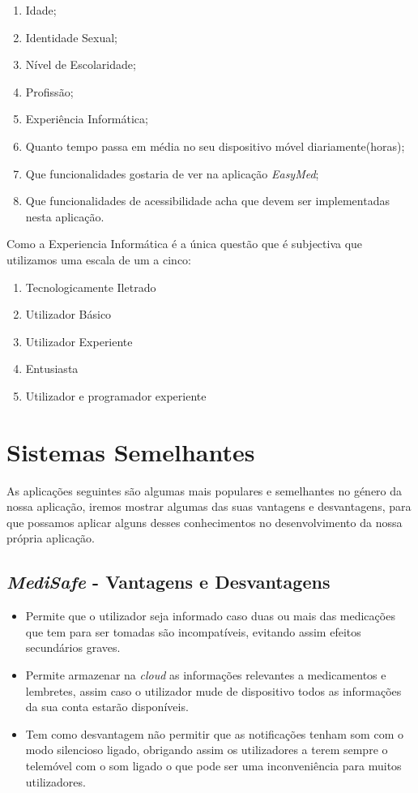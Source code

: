 \documentclass[a4paper]{article}
\begin{document}
\begin{enumerate}
    \item Idade;
    \item Identidade Sexual;
    \item Nível de Escolaridade;
    \item Profissão;
    \item Experiência Informática;
    \item Quanto tempo passa em média no seu dispositivo móvel diariamente(horas);
    \item Que funcionalidades gostaria de ver na aplicação \textit{EasyMed};
    \item Que funcionalidades de acessibilidade acha que devem ser implementadas nesta aplicação.
\end{enumerate}

\vspace{1cm}
Como a Experiencia Informática é a única questão que é subjectiva que utilizamos uma escala de um a cinco: 
\begin{enumerate}
    \item Tecnologicamente Iletrado
    \item Utilizador Básico
    \item Utilizador Experiente
    \item Entusiasta
    \item Utilizador e programador experiente
\end{enumerate}

\section{Sistemas Semelhantes}\label{section:similar_analysis}
As aplicações seguintes são algumas mais populares e semelhantes no género da nossa aplicação, iremos mostrar algumas das suas vantagens e desvantagens, para que possamos aplicar alguns desses conhecimentos no desenvolvimento da nossa própria aplicação. \cite{sim_apps}

\subsection{\textit{MediSafe} - Vantagens e Desvantagens}

\begin{itemize}
    \item Permite que o utilizador seja informado caso duas ou mais das medicações que tem para ser tomadas são incompatíveis, evitando assim efeitos secundários graves.
    \item Permite armazenar na \textit{cloud} as informações relevantes a medicamentos e lembretes, assim caso o utilizador mude de dispositivo todos as informações da sua conta estarão disponíveis.
    \item Tem como desvantagem não permitir que as notificações tenham som com o modo silencioso ligado, obrigando assim os utilizadores a terem sempre o telemóvel com o som ligado o que pode ser uma inconveniência para muitos utilizadores.
\end{itemize}
\end{document}
